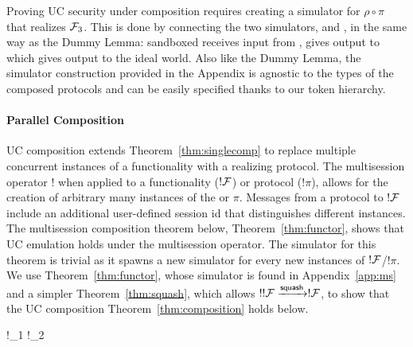 Proving UC security under composition requires creating a simulator for $\rho \circ \pi$ that realizes $\mathcal{F}_3$. 
This is done by connecting the two simulators, \SIM{\pi} and \SIM{\rho}, in the same way as the Dummy Lemma: sandboxed \SIM{\pi} receives input from \Z, gives output to \SIM{\rho} which gives output to the ideal world.  
Also like the Dummy Lemma, the simulator construction provided in the Appendix is agnostic to the types of the composed protocols and can be easily specified thanks to our token hierarchy. 

\paragraph*{\textbf{Parallel Composition}}
UC composition extends Theorem~\ref{thm:singlecomp} to replace multiple concurrent instances of a functionality with a realizing protocol. 
The multisession operator $!$ when applied to a functionality ($!\mathcal{F}$) or protocol ($!\pi$), allows for the creation of arbitrary many instances of the \F or $\pi$.
Messages from a protocol to $!\mathcal{F}$ include an additional user-defined session id that distinguishes different instances. 
The multisession composition theorem below, Theorem~\ref{thm:functor}, shows that UC emulation holds under the multisession operator. 
The simulator for this theorem is trivial as it spawns a new simulator for every new instances of $!\mathcal{F}$/$!\pi$.
We use Theorem~\ref{thm:functor}, whose simulator is found in Appendix~\ref{app:ms} and a simpler Theorem~\ref{thm:squash}, which allows $!!\mathcal{F} \xrightarrow{{\mathsf {squash}}} !\mathcal{F}$, 
to show that the UC composition Theorem~\ref{thm:composition} holds below.

\begin{theorem}\label{thm:functor}
\vspace{-0.5em}
	\begin{mathpar}
		{
			!\F_1 \xrightarrow{!\pi} !\F_2
		}
	\end{mathpar}
\end{theorem}


